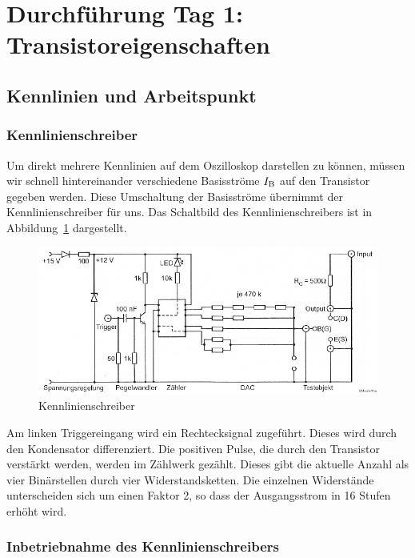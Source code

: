 \FloatBarrier
\section{Durchführung Tag 1: Transistoreigenschaften}

\FloatBarrier
\subsection{Kennlinien und Arbeitspunkt}

\subsubsection{Kennlinienschreiber}

Um direkt mehrere Kennlinien auf dem Oszilloskop darstellen zu können, müssen
wir schnell hintereinander verschiedene Basisströme $I_\text{B}$ auf den Transistor
gegeben werden. Diese Umschaltung der Basisströme übernimmt der
Kennlinienschreiber für uns. Das Schaltbild des Kennlinienschreibers ist in
Abbildung~\ref{fig:3-1} dargestellt.

\begin{figure}[htbp]
	\centering
	\includegraphics[width=\textwidth]{Anleitung/3-1.png}
	\caption{
		Kennlinienschreiber \cite[Abbildung~3.1]{physik313-Anleitung}
	}
	\label{fig:3-1}
\end{figure}

Am linken Triggereingang wird ein
Rechtecksignal zugeführt. Dieses wird durch den Kondensator differenziert. Die
positiven Pulse, die durch den Transistor verstärkt werden, werden im Zählwerk
gezählt. Dieses gibt die aktuelle Anzahl als vier Binärstellen durch vier
Widerstandsketten. Die einzelnen Widerstände unterscheiden sich um einen Faktor
2, so dass der Ausgangsstrom in 16 Stufen erhöht wird.

\subsubsection{Inbetriebnahme des Kennlinienschreibers}

